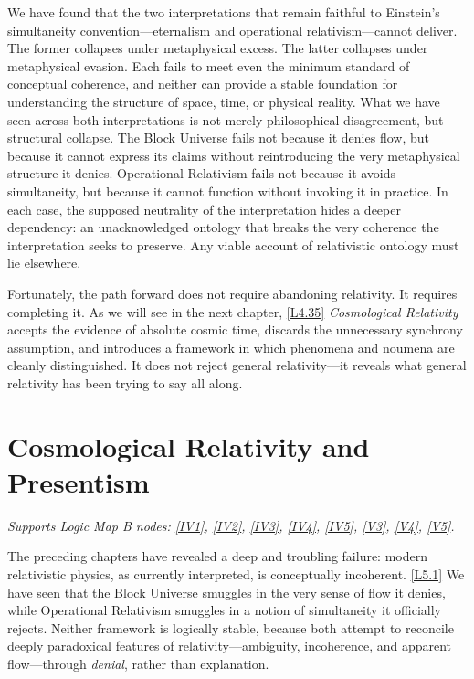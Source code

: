 \documentclass[12pt]{book}
\newcounter{logicanchor}
\newenvironment{logicanchorenv}[1]{\refstepcounter{logicanchor}\label{#1}}{}
\newcommand{\logiclink}[2]{\begin{logicanchorenv}{logic:#1}\end{logicanchorenv}\hyperref[appendix:#1]{[#1]}\xspace}
\begin{document}
We have found that the two interpretations that remain faithful to Einstein's simultaneity convention---eternalism and operational relativism---cannot deliver. The former collapses under metaphysical excess. The latter collapses under metaphysical evasion. Each fails to meet even the minimum standard of conceptual coherence, and neither can provide a stable foundation for understanding the structure of space, time, or physical reality. What we have seen across both interpretations is not merely philosophical disagreement, but structural collapse. The Block Universe fails not because it denies flow, but because it cannot express its claims without reintroducing the very metaphysical structure it denies. Operational Relativism fails not because it avoids simultaneity, but because it cannot function without invoking it in practice. In each case, the supposed neutrality of the interpretation hides a deeper dependency: an unacknowledged ontology that breaks the very coherence the interpretation seeks to preserve. Any viable account of relativistic ontology must lie elsewhere.

Fortunately, the path forward does not require abandoning relativity. It requires completing it. As we will see in the next chapter, \logiclink{L4.35}{} \textit{Cosmological Relativity} accepts the evidence of absolute cosmic time, discards the unnecessary synchrony assumption, and introduces a framework in which phenomena and noumena are cleanly distinguished. It does not reject general relativity---it reveals what general relativity has been trying to say all along.

\chapter[Cosmological Relativity]{Cosmological Relativity and Presentism}\label{sec:5}
\noindent\textit{Supports Logic Map B nodes: \hyperref[appendix:IV1]{[IV1]}, \hyperref[appendix:IV2]{[IV2]}, \hyperref[appendix:IV3]{[IV3]}, \hyperref[appendix:IV4]{[IV4]}, \hyperref[appendix:IV5]{[IV5]}, \hyperref[appendix:V3]{[V3]}, \hyperref[appendix:V4]{[V4]}, \hyperref[appendix:V5]{[V5]}.}

\vspace{4pt}

The preceding chapters have revealed a deep and troubling failure: modern relativistic physics, as currently interpreted, is conceptually incoherent. \logiclink{L5.1}{} We have seen that the Block Universe smuggles in the very sense of flow it denies, while Operational Relativism smuggles in a notion of simultaneity it officially rejects. Neither framework is logically stable, because both attempt to reconcile deeply paradoxical features of relativity---ambiguity, incoherence, and apparent flow---through \textit{denial}, rather than explanation.
\end{document}

